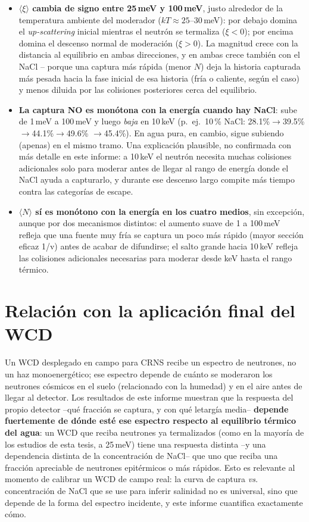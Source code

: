 \documentclass[11pt,a4paper]{article}
\begin{document}
\begin{itemize}
  \item \textbf{$\langle\xi\rangle$ cambia de signo entre 25\,meV y 100\,meV}, justo alrededor de la
  temperatura ambiente del moderador ($kT\approx25$--$30$\,meV): por debajo domina el
  \textit{up-scattering} inicial mientras el neutrón se termaliza ($\xi<0$); por encima domina el
  descenso normal de moderación ($\xi>0$). La magnitud crece con la distancia al equilibrio en ambas
  direcciones, y en ambas crece también con el NaCl -- porque una captura más rápida (menor $N$) deja
  la historia capturada más pesada hacia la fase inicial de esa historia (fría o caliente, según el
  caso) y menos diluida por las colisiones posteriores cerca del equilibrio.
  \item \textbf{La captura NO es monótona con la energía cuando hay NaCl}: sube de 1\,meV a 100\,meV
  y luego \emph{baja} en 10\,keV (p.\ ej.\ 10\,\% NaCl: 28.1\%$\to$39.5\%$\to$44.1\%$\to$49.6\%
  $\to$45.4\%). En agua pura, en cambio, sigue subiendo (apenas) en el mismo tramo. Una explicación
  plausible, no confirmada con más detalle en este informe: a 10\,keV el neutrón necesita muchas
  colisiones adicionales solo para moderar antes de llegar al rango de energía donde el NaCl ayuda a
  capturarlo, y durante ese descenso largo compite más tiempo contra las categorías de escape.
  \item \textbf{$\langle N\rangle$ sí es monótono con la energía en los cuatro medios}, sin excepción,
  aunque por dos mecanismos distintos: el aumento suave de 1 a 100\,meV refleja que una fuente muy
  fría se captura un poco más rápido (mayor sección eficaz 1/v) antes de acabar de difundirse; el
  salto grande hacia 10\,keV refleja las colisiones adicionales necesarias para moderar desde keV
  hasta el rango térmico.
\end{itemize}

\section{Relación con la aplicación final del WCD}

Un WCD desplegado en campo para CRNS recibe un espectro de neutrones, no un haz monoenergético; ese
espectro depende de cuánto se moderaron los neutrones cósmicos en el suelo (relacionado con la
humedad) y en el aire antes de llegar al detector. Los resultados de este informe muestran que la
respuesta del propio detector --qué fracción se captura, y con qué letargía media-- \textbf{depende
fuertemente de dónde esté ese espectro respecto al equilibrio térmico del agua}: un WCD que reciba
neutrones ya termalizados (como en la mayoría de los estudios de esta tesis, a 25\,meV) tiene una
respuesta distinta --y una dependencia distinta de la concentración de NaCl-- que uno que reciba una
fracción apreciable de neutrones epitérmicos o más rápidos. Esto es relevante al momento de calibrar
un WCD de campo real: la curva de captura \textit{vs.} concentración de NaCl que se use para inferir
salinidad no es universal, sino que depende de la forma del espectro incidente, y este informe
cuantifica exactamente cómo.
\end{document}
